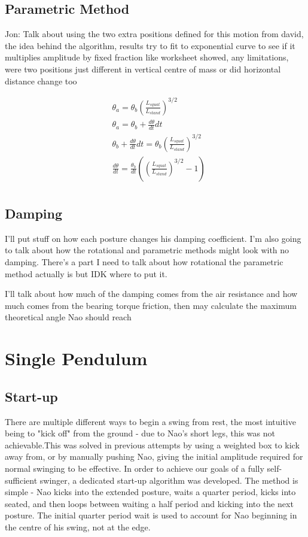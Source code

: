 \documentclass[11pt]{article}
\newcommand*\ruleline[1]{\par\noindent\raisebox{.8ex}{\makebox[\linewidth]{\hrulefill\hspace{1ex}\raisebox{-.8ex}{#1}\hspace{1ex}\hrulefill}}}
\begin{document}
\subsection{Parametric Method}
Jon: Talk about using the two extra positions defined for this motion from david, the idea behind the algorithm, results try to fit to exponential curve to see if it multiplies amplitude by fixed fraction like worksheet showed, any limitations, were two positions just different in vertical centre of mass or did horizontal distance change too

\begin{align}
    &\theta_a = \theta_b (\frac{L_{squat}}{L_{stand}})^{3/2}\\
    &\theta_a = \theta_b + \frac{d\theta}{dt}dt\\
    &\theta_b + \frac{d\theta}{dt}dt = \theta_b (\frac{L_{squat}}{L_{stand}})^{3/2}\\
    &\frac{d\theta}{dt} = \frac{\theta_b}{dt} ((\frac{L_{squat}}{L_{stand}})^{3/2} - 1)\\ 
\end{align}


\subsection{Damping}
\ruleline{James Doering}
I'll put stuff on how each posture changes his damping coefficient.
I'm also going to talk about how the rotational and parametric methods might look with no damping.
There's a part I need to talk about how rotational the parametric method actually is but IDK where to put it.

\ruleline{George Sheppard}
I'll talk about how much of the damping comes from the air resistance and how much comes from the bearing torque friction, then may calculate the maximum theoretical angle Nao should reach


\section{Single Pendulum}
\subsection{Start-up}
\ruleline{James Doering}
There are multiple different ways to begin a swing from rest, the most intuitive being to "kick off" from the ground - due to Nao's short legs, this was not achievable.This was solved in previous attempts by using a weighted box to kick away from, or by manually pushing Nao, giving the initial amplitude required for normal swinging to be effective. In order to achieve our goals of a fully self-sufficient swinger, a dedicated start-up algorithm was developed. The method is simple - Nao kicks into the extended posture, waits a quarter period, kicks into seated, and then loops between waiting a half period and kicking into the next posture. The initial quarter period wait is used to account for Nao beginning in the centre of his swing, not at the edge. \\
\end{document}
